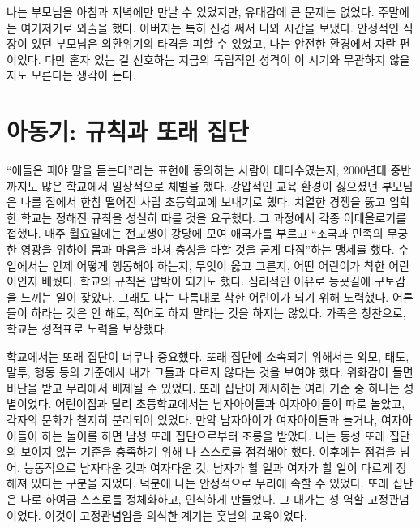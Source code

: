 
나는 부모님을 아침과 저녁에만 만날 수 있었지만, 유대감에 큰 문제는 없었다. 주말에는 여기저기로 외출을 했다. 아버지는 특히 신경 써서 나와 시간을 보냈다. 안정적인 직장이 있던 부모님은 외환위기의 타격을 피할 수 있었고, 나는 안전한 환경에서 자란 편이었다. 다만 혼자 있는 걸 선호하는 지금의 독립적인 성격이 이 시기와 무관하지 않을지도 모른다는 생각이 든다.

\section*{아동기: 규칙과 또래 집단}

``애들은 패야 말을 듣는다''라는 표현에 동의하는 사람이 대다수였는지, 2000년대 중반까지도 많은 학교에서 일상적으로 체벌을 했다. 강압적인 교육 환경이 싫으셨던 부모님은 나를 집에서 한참 떨어진 사립 초등학교에 보내기로 했다. 치열한 경쟁을 뚫고 입학한 학교는 정해진 규칙을 성실히 따를 것을 요구했다. 그 과정에서 각종 이데올로기를 접했다. 매주 월요일에는 전교생이 강당에 모여 애국가를 부르고 ``조국과 민족의 무궁한 영광을 위하여 몸과 마음을 바쳐 충성을 다할 것을 굳게 다짐''하는 맹세를 했다. 수업에서는 언제 어떻게 행동해야 하는지, 무엇이 옳고 그른지, 어떤 어린이가 착한 어린이인지 배웠다. 학교의 규칙은 압박이 되기도 했다. 심리적인 이유로 등굣길에 구토감을 느끼는 일이 잦았다. 그래도 나는 나름대로 착한 어린이가 되기 위해 노력했다. 어른들이 하라는 것은 안 해도, 적어도 하지 말라는 것을 하지는 않았다. 가족은 칭찬으로, 학교는 성적표로 노력을 보상했다.

학교에서는 또래 집단이 너무나 중요했다. 또래 집단에 소속되기 위해서는 외모, 태도, 말투, 행동 등의 기준에서 내가 그들과 다르지 않다는 것을 보여야 했다. 위화감이 들면 비난을 받고 무리에서 배제될 수 있었다. 또래 집단이 제시하는 여러 기준 중 하나는 성별이었다. 어린이집과 달리 초등학교에서는 남자아이들과 여자아이들이 따로 놀았고, 각자의 문화가 철저히 분리되어 있었다. 만약 남자아이가 여자아이들과 놀거나, 여자아이들이 하는 놀이를 하면 남성 또래 집단으로부터 조롱을 받았다. 나는 동성 또래 집단의 보이지 않는 기준을 충족하기 위해 나 스스로를 점검해야 했다. 이후에는 점검을 넘어, 능동적으로 남자다운 것과 여자다운 것, 남자가 할 일과 여자가 할 일이 다르게 정해져 있다는 구분을 지었다. 덕분에 나는 안정적으로 무리에 속할 수 있었다. 또래 집단은 나로 하여금 스스로를 정체화하고, 인식하게 만들었다. 그 대가는 성 역할 고정관념이었다. 이것이 고정관념임을 의식한 계기는 훗날의 교육이었다.

